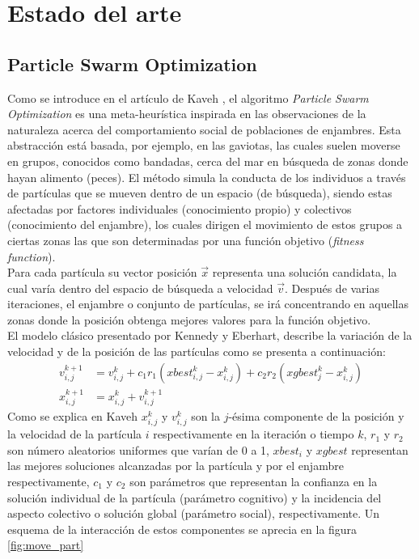 
\chapter{Estado del arte}
\section{Particle Swarm Optimization}
Como se introduce en el artículo de Kaveh \cite{Psoexplain14}, el algoritmo \emph{Particle Swarm Optimization} es una meta-heurística inspirada en las observaciones de la naturaleza acerca del comportamiento social de poblaciones de enjambres. Esta abstracción está basada, por ejemplo, en las gaviotas, las cuales suelen moverse en grupos, conocidos como bandadas, cerca del mar en búsqueda de zonas donde hayan alimento (peces). El método simula la conducta de los individuos a través de partículas que se mueven dentro de un espacio (de búsqueda), siendo estas afectadas por factores individuales (conocimiento propio) y colectivos (conocimiento del enjambre), los cuales dirigen el movimiento de estos grupos a ciertas zonas las que son determinadas por una función objetivo (\emph{fitness function}).\\
Para cada partícula su vector posición  $\vec{x}$ representa una solución candidata, la cual varía dentro del espacio de búsqueda a velocidad $\vec{v}$. Después de varias iteraciones, el enjambre o conjunto de partículas, se irá concentrando en aquellas zonas donde la posición obtenga mejores valores para la función objetivo.
\\El modelo clásico presentado por Kennedy y Eberhart\cite{Kennedy95}, describe la variación de la velocidad y de la posición de las partículas como se presenta a continuación:
\begin{align}
    v_{i,j}^{k+1} &= v_{i,j}^{k} + c_{1}r_{1}(xbest_{i,j}^k - x_{i,j}^k) + c_{2}r_{2}(xgbest_{j}^{k} - x_{i,j}^k) \\
    x_{i,j}^{k+1} &= x_{i,j}^{k} + v_{i,j}^{k+1}
\end{align}    
Como se explica en Kaveh \cite{Psoexplain14} $x_{i,j}^{k}$ y $v_{i,j}^{k}$ son la $j$-ésima componente de la posición y la velocidad de la partícula $i$ respectivamente en la iteración o tiempo $k$, $r_{1}$ y $r_{2}$ son número aleatorios uniformes que varían de 0 a 1, $xbest_i$ y $xgbest$ representan las mejores soluciones alcanzadas por la partícula y por el enjambre respectivamente, $c_1$ y $c_2$ son parámetros que representan la confianza en la solución individual de la partícula (parámetro cognitivo) y la incidencia del aspecto colectivo o solución global (parámetro social), respectivamente. Un esquema de la interacción de estos componentes se aprecia en la figura \ref{fig:move_part}\\
